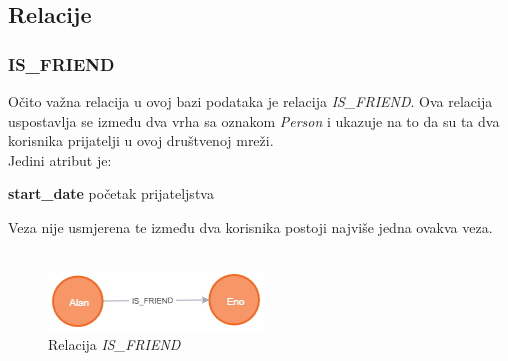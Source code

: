 \documentclass[titlepage, 12pt]{scrartcl}
\begin{document}
\subsection{Relacije}
\subsubsection{IS\_FRIEND}
Očito važna relacija u ovoj bazi podataka je relacija \emph{IS\_FRIEND}. Ova relacija uspostavlja se između dva vrha sa oznakom \emph{Person} i ukazuje na to da su ta dva korisnika prijatelji u ovoj društvenoj mreži. \\
Jedini atribut je:
\begin{itemize}
\begin{samepage}
    \item \textbf{start\_date} početak prijateljstva
\end{samepage}
\end{itemize}
Veza nije usmjerena te između dva korisnika postoji najviše jedna ovakva veza. \\ \\

\begin{figure}[h]
    \centering
    \includegraphics[scale=0.7]{slike/IS_FRIEND.png}
    \caption{Relacija \emph{IS\_FRIEND}}
    \label{fig:friendship}
\end{figure}
\end{document}
